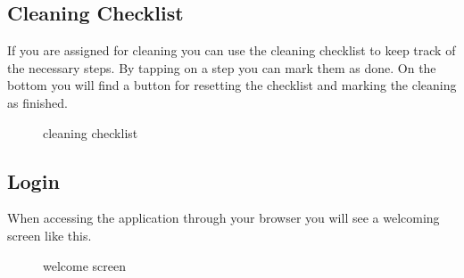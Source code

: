 \subsection{Cleaning Checklist}\label{cleaning-checklist-1}

If you are assigned for cleaning you can use the cleaning checklist to
keep track of the necessary steps. By tapping on a step you can mark
them as done. On the bottom you will find a button for resetting the
checklist and marking the cleaning as finished.

\begin{figure}[htbp]
\centering
{}
\caption{cleaning checklist}
\end{figure}

\subsection{Login}\label{login-1}

When accessing the application through your browser you will see a
welcoming screen like this.

\begin{figure}[htbp]
\centering
{}
\caption{welcome screen}
\end{figure}

